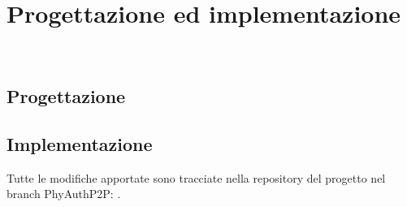 \chapter{Progettazione ed implementazione}
\label{cap:progettazione}

\\

\section{Progettazione}

\section{Implementazione}






Tutte le modifiche apportate sono tracciate nella repository del progetto nel branch PhyAuthP2P: \cite{site:openvlc-pa-github}.